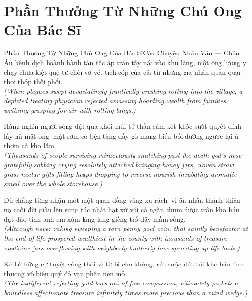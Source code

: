 \section{Phần Thưởng Từ Những Chú Ong Của Bác Sĩ}
\begin{truyen}{Phần Thưởng Từ Những Chú Ong Của Bác Sĩ}{Câu Chuyện Nhân Văn --- Châu Âu}
 bệnh dịch hoành hành tàn tốc ập tràn tấy nát vào khu làng, một ông lương y chạy chữa kiệt quệ từ chối vơ vét tích cóp của cải từ những gia nhân quằn quại thoi thóp thối phổi.\\[4pt]
\textit{(When plagues swept devastatingly frantically crashing rotting into the village, a depleted treating physician rejected amassing hoarding wealth from families writhing grasping for air with rotting lungs.)}

Hàng nghìn người sống dật qua khỏi mũi tử thần cảm kết khóc sướt quyết đính lấy hũ mật ong, mật rơm cỏ bện tặng đầy gò mang biếu bồi dưỡng ngược lại ủ thơm cả kho lẫm.\\[4pt]
\textit{(Thousands of people surviving miraculously snatching past the death god's nose gratefully sobbing crying resolutely attached bringing honey jars, woven straw grass nectar gifts filling heaps dropping to reverse nourish incubating aromatic smell over the whole storehouse.)}

Dù chẳng từng nhận mót một quan đồng vàng xu rách, vị ân nhân thánh thiện nọ cuối đời giàu lên sung túc nhất hạt xứ với cả ngàn chum dược trân kho báu dạt dào tình anh em xóm láng láng giềng trổ dậy mầm sống.\\[4pt]
\textit{(Although never raking sweeping a torn penny gold coin, that saintly benefactor at the end of life prospered wealthiest in the county with thousands of treasure medicine jars overflowing with neighborly brotherly love sprouting up life buds.)}

\end{truyen}
\begin{baihoc}
  Kẻ hờ hững cự tuyệt vàng thỏi vì từ bi cho không, rút cuộc đút túi kho báu tình thương vô biên quý đỏ vạn phần nén mỏ.\\[4pt]
  \textit{(The indifferent rejecting gold bars out of free compassion, ultimately pockets a boundless affectionate treasure infinitely times more precious than a mind wedge.)}
\end{baihoc}


